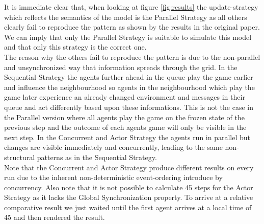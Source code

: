 
    
It is immediate clear that, when looking at figure \ref{fig:results} the update-strategy which reflects the semantics of the model is the Parallel Strategy as all others clearly fail to reproduce the pattern as shown by the results in the original paper. We can imply that only the Parallel Strategy is suitable to simulate this model and that only this strategy is the correct one. \\
The reason why the others fail to reproduce the pattern is due to the non-parallel and unsynchronized way that information spreads through the grid. In the Sequential Strategy the agents further ahead in the queue play the game earlier and influence the neighbourhood so agents in the neighbourhood which play the game later experience an already changed environment and  messages in their queue and act differently based upon these informations. This is not the case in the Parallel version where all agents play the game on the frozen state of the previous step and the outcome of each agents game will only be visible in the next step. In the Concurrent and Actor Strategy the agents run in parallel but changes are visible immediately and concurrently, leading to the same non-structural patterns as in the Sequential Strategy. \\
Note that the Concurrent and Actor Strategy produce different results on every run due to the inherent non-deterministic event-ordering introduce by concurrency. Also note that it is not possible to calculate 45 steps for the Actor Strategy as it lacks the Global Synchronization property. To arrive at a relative comparative result we just waited until the first agent arrives at a local time of 45 and then rendered the result. 


